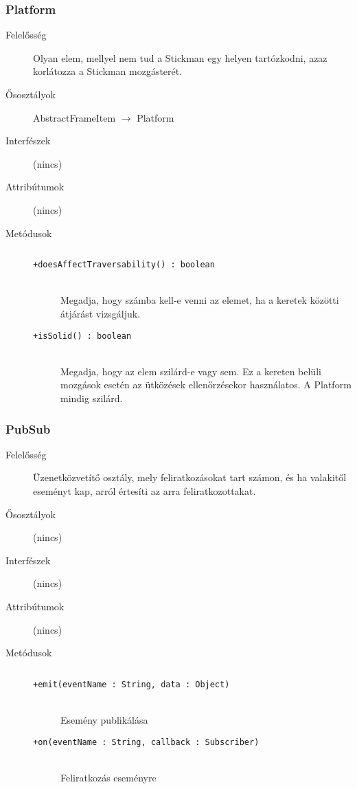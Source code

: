 		\subsubsection{Platform}
			\begin{description}

				\item[Felelősség] Olyan elem, mellyel nem tud a Stickman egy helyen tartózkodni, azaz korlátozza a Stickman mozgásterét.

				\item[Ősosztályok] AbstractFrameItem $\rightarrow{}$ Platform
				\item[Interfészek] (nincs)
				\item[Attribútumok] (nincs)
				\item[Metódusok]$\ $
					\begin{description}
						\item[\texttt{+doesAffectTraversability() : boolean}] \hfill \\Megadja, hogy számba kell-e venni az elemet,  ha a keretek közötti átjárást vizsgáljuk. 
						\item[\texttt{+isSolid() : boolean}] \hfill \\Megadja, hogy az elem szilárd-e vagy sem.  Ez a kereten belüli mozgások esetén az  ütközések ellenőrzésekor használatos.    A Platform mindig szilárd. 
					\end{description}
			\end{description}

		\subsubsection{PubSub}
			\begin{description}

				\item[Felelősség] Üzenetközvetítő osztály, mely feliratkozásokat tart számon, és ha valakitől eseményt kap, arról értesíti az arra feliratkozottakat.

				\item[Ősosztályok] (nincs)
				\item[Interfészek] (nincs)
				\item[Attribútumok] (nincs)
				\item[Metódusok]$\ $
					\begin{description}
						\item[\texttt{+emit(eventName : String, data : Object)}] \hfill \\Esemény publikálása 
						\item[\texttt{+on(eventName : String, callback : Subscriber)}] \hfill \\Feliratkozás eseményre 
					\end{description}
			\end{description}

